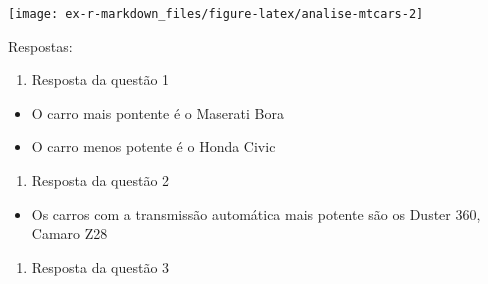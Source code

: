 \documentclass[
]{article}
\newenvironment{Shaded}{\begin{snugshade}}{\end{snugshade}}
\newcommand{\AttributeTok}[1]{\textcolor[rgb]{0.77,0.63,0.00}{#1}}
\newcommand{\DecValTok}[1]{\textcolor[rgb]{0.00,0.00,0.81}{#1}}
\newcommand{\FunctionTok}[1]{\textcolor[rgb]{0.00,0.00,0.00}{#1}}
\newcommand{\NormalTok}[1]{#1}
\newcommand{\OtherTok}[1]{\textcolor[rgb]{0.56,0.35,0.01}{#1}}
\newcommand{\SpecialCharTok}[1]{\textcolor[rgb]{0.00,0.00,0.00}{#1}}
\newcommand{\StringTok}[1]{\textcolor[rgb]{0.31,0.60,0.02}{#1}}
\providecommand{\tightlist}{%
  \setlength{\itemsep}{0pt}\setlength{\parskip}{0pt}}
\begin{document}
\begin{Shaded}
\end{Shaded}

\begin{center}\texttt{[image: ex-r-markdown\_files/figure-latex/analise-mtcars-2]} \end{center}

\begin{Shaded}
\end{Shaded}

Respostas:

\begin{enumerate}
\def\labelenumi{\arabic{enumi}.}
\tightlist
\item
  Resposta da questão 1
\end{enumerate}

\begin{itemize}
\tightlist
\item
  O carro mais pontente é o Maserati Bora
\item
  O carro menos potente é o Honda Civic
\end{itemize}

\begin{enumerate}
\def\labelenumi{\arabic{enumi}.}
\setcounter{enumi}{1}
\tightlist
\item
  Resposta da questão 2
\end{enumerate}

\begin{itemize}
\tightlist
\item
  Os carros com a transmissão automática mais potente são os Duster 360,
  Camaro Z28
\end{itemize}

\begin{enumerate}
\def\labelenumi{\arabic{enumi}.}
\setcounter{enumi}{2}
\tightlist
\item
  Resposta da questão 3
\end{enumerate}
\end{document}
